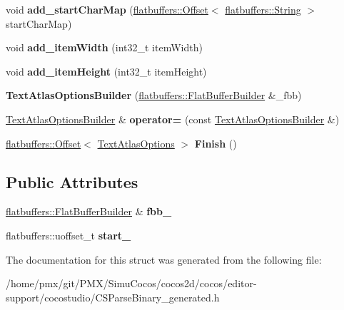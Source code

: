 \begin{DoxyCompactItemize}
void {\bfseries add\+\_\+start\+Char\+Map} (\hyperlink{structflatbuffers_1_1Offset}{flatbuffers\+::\+Offset}$<$ \hyperlink{structflatbuffers_1_1String}{flatbuffers\+::\+String} $>$ start\+Char\+Map)
\item 
\mbox{\label{structflatbuffers_1_1TextAtlasOptionsBuilder_a5c22c172e10c92f8d6ad0facca010a95}} 
void {\bfseries add\+\_\+item\+Width} (int32\+\_\+t item\+Width)
\item 
\mbox{\label{structflatbuffers_1_1TextAtlasOptionsBuilder_afecfd1739357b0ed3c60208bfc615281}} 
void {\bfseries add\+\_\+item\+Height} (int32\+\_\+t item\+Height)
\item 
\mbox{\label{structflatbuffers_1_1TextAtlasOptionsBuilder_a8f1883ce9c543b71f4f7ef2bc8fb8e4d}} 
{\bfseries Text\+Atlas\+Options\+Builder} (\hyperlink{classflatbuffers_1_1FlatBufferBuilder}{flatbuffers\+::\+Flat\+Buffer\+Builder} \&\+\_\+fbb)
\item 
\mbox{\label{structflatbuffers_1_1TextAtlasOptionsBuilder_ae9c3a00ba68b9312732c5846e472aa72}} 
\hyperlink{structflatbuffers_1_1TextAtlasOptionsBuilder}{Text\+Atlas\+Options\+Builder} \& {\bfseries operator=} (const \hyperlink{structflatbuffers_1_1TextAtlasOptionsBuilder}{Text\+Atlas\+Options\+Builder} \&)
\item 
\mbox{\label{structflatbuffers_1_1TextAtlasOptionsBuilder_a1b8065f8ef717e59ed8a09d1384c70d6}} 
\hyperlink{structflatbuffers_1_1Offset}{flatbuffers\+::\+Offset}$<$ \hyperlink{structflatbuffers_1_1TextAtlasOptions}{Text\+Atlas\+Options} $>$ {\bfseries Finish} ()
\end{DoxyCompactItemize}
\subsection*{Public Attributes}
\begin{DoxyCompactItemize}
\item 
\mbox{\label{structflatbuffers_1_1TextAtlasOptionsBuilder_a1215d7ef36cd1dda7b5b11806ef778da}} 
\hyperlink{classflatbuffers_1_1FlatBufferBuilder}{flatbuffers\+::\+Flat\+Buffer\+Builder} \& {\bfseries fbb\+\_\+}
\item 
\mbox{\label{structflatbuffers_1_1TextAtlasOptionsBuilder_ad5e9be704a76633d71dda8646f757867}} 
flatbuffers\+::uoffset\+\_\+t {\bfseries start\+\_\+}
\end{DoxyCompactItemize}


The documentation for this struct was generated from the following file\+:\begin{DoxyCompactItemize}
\item 
/home/pmx/git/\+P\+M\+X/\+Simu\+Cocos/cocos2d/cocos/editor-\/support/cocostudio/C\+S\+Parse\+Binary\+\_\+generated.\+h\end{DoxyCompactItemize}
